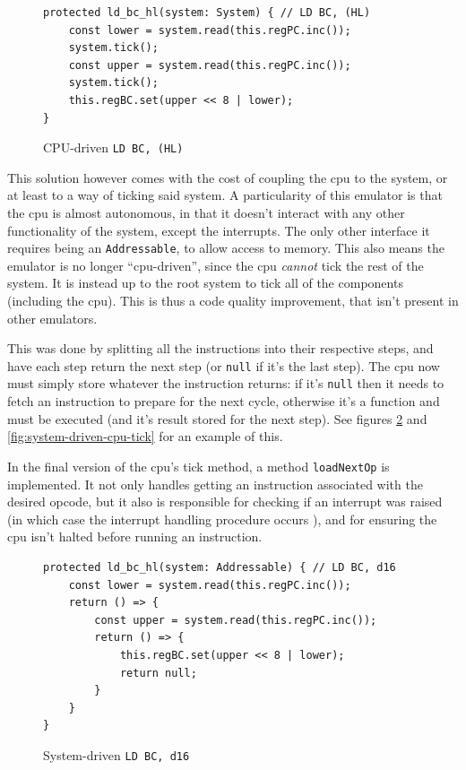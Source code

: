 \documentclass[11pt]{report}
\begin{document}
\begin{figure}[h]
    \begin{verbatim}
protected ld_bc_hl(system: System) { // LD BC, (HL)
    const lower = system.read(this.regPC.inc());
    system.tick();
    const upper = system.read(this.regPC.inc());
    system.tick();
    this.regBC.set(upper << 8 | lower);
}
    \end{verbatim}
    \caption{CPU-driven \texttt{LD BC, (HL)}}
    \label{fig:cpu-driven-ld}
\end{figure}

This solution however comes with the cost of coupling the \gls{cpu} to the system, or at least to a way of ticking said system. A particularity of this emulator is that the \gls{cpu} is almost autonomous, in that it doesn't interact with any other functionality of the system, except the interrupts. The only other interface it requires being an \texttt{Addressable}, to allow access to memory. This also means the emulator is no longer ``\gls{cpu}-driven'', since the \gls{cpu} \textit{cannot} tick the rest of the system. It is instead up to the root system to tick all of the components (including the \gls{cpu}). This is thus a code quality improvement, that isn't present in other emulators.

This was done by splitting all the instructions into their respective steps, and have each step return the next step (or \texttt{null} if it's the last step). The \gls{cpu} now must simply store whatever the instruction returns: if it's \texttt{null} then it needs to fetch an instruction to prepare for the next cycle, otherwise it's a function and must be executed (and it's result stored for the next step). See figures \ref{fig:system-driven-ld} and \ref{fig:system-driven-cpu-tick} for an example of this.

In the final version of the \gls{cpu}'s tick method, a method \texttt{loadNextOp} is implemented. It not only handles getting an instruction associated with the desired opcode, but it also is responsible for checking if an interrupt was raised (in which case the interrupt handling procedure occurs \cite[Interrupts]{pandoc}), and for ensuring the \gls{cpu} isn't halted before running an instruction.

\begin{figure}[h]
    \begin{verbatim}
protected ld_bc_hl(system: Addressable) { // LD BC, d16
    const lower = system.read(this.regPC.inc());
    return () => {
        const upper = system.read(this.regPC.inc());
        return () => {
            this.regBC.set(upper << 8 | lower);
            return null;
        }
    }
}
    \end{verbatim}
    \caption{System-driven \texttt{LD BC, d16}}
    \label{fig:system-driven-ld}
\end{figure}
\end{document}
